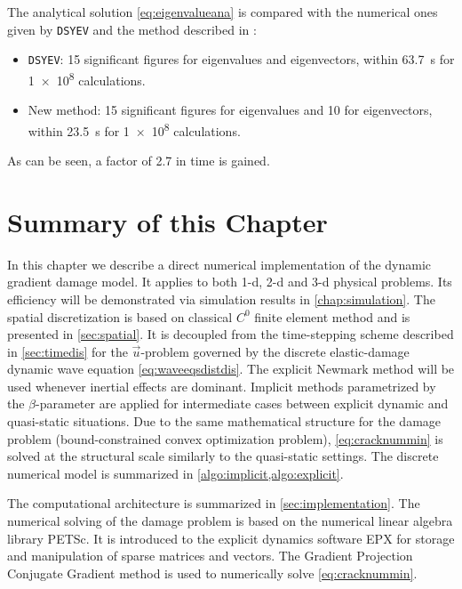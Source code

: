 The analytical solution \eqref{eq:eigenvalueana} is compared with the numerical ones given by \texttt{DSYEV} and the method described in \cite{Scherzinger:2008aa}:
\begin{itemize}
\item \texttt{DSYEV}: 15 significant figures for eigenvalues and eigenvectors, within \SI{63.7}{s} for \num{1e8} calculations.
\item New method: 15 significant figures for eigenvalues and 10 for eigenvectors, within \SI{23.5}{s} for \num{1e8} calculations.
\end{itemize}
As can be seen, a factor of 2.7 in time is gained.

\section*{Summary of this Chapter}
In this chapter we describe a direct numerical implementation of the dynamic gradient damage model. It applies to both 1-d, 2-d and 3-d physical problems. Its efficiency will be demonstrated via simulation results in \cref{chap:simulation}. The spatial discretization is based on classical $C^0$ finite element method and is presented in \cref{sec:spatial}. It is decoupled from the time-stepping scheme described in \cref{sec:timedis} for the $\vec{u}$-problem governed by the discrete elastic-damage dynamic wave equation \eqref{eq:waveeqsdistdis}. The explicit Newmark method will be used whenever inertial effects are dominant. Implicit methods parametrized by the $\beta$-parameter are applied for intermediate cases between explicit dynamic and quasi-static situations. Due to the same mathematical structure for the damage problem (bound-constrained convex optimization problem), \eqref{eq:cracknummin} is solved at the structural scale similarly to the quasi-static settings. The discrete numerical model is summarized in \cref{algo:implicit,algo:explicit}.

The computational architecture is summarized in \cref{sec:implementation}. The numerical solving of the damage problem is based on the numerical linear algebra library PETSc. It is introduced to the explicit dynamics software EPX for storage and manipulation of sparse matrices and vectors. The Gradient Projection Conjugate Gradient method is used to numerically solve \eqref{eq:cracknummin}.